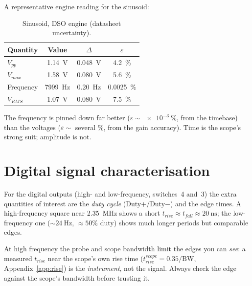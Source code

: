 \documentclass[11pt,a4paper,oneside]{book}
\begin{document}
A representative engine reading for the sinusoid:

\begin{table}[h]\centering\small
\caption{Sinusoid, DSO engine (datasheet uncertainty).}
\begin{tabular}{@{}lccc@{}}
\toprule
Quantity & Value & $\Delta$ & $\varepsilon$\\
\midrule
$V_{pp}$   & \qty{1.14}{\volt}   & \qty{0.048}{\volt}  & \qty{4.2}{\percent}\\
$V_{max}$  & \qty{1.58}{\volt}   & \qty{0.080}{\volt}  & \qty{5.6}{\percent}\\
Frequency  & \qty{7999}{\hertz}  & \qty{0.20}{\hertz}  & \qty{0.0025}{\percent}\\
$V_{RMS}$  & \qty{1.07}{\volt}   & \qty{0.080}{\volt}  & \qty{7.5}{\percent}\\
\bottomrule
\end{tabular}
\end{table}

\begin{note}
The frequency is pinned down far better ($\varepsilon\sim\qty{e-3}{\percent}$,
from the timebase) than the voltages ($\varepsilon\sim$ several \unit{\percent},
from the gain accuracy). Time is the scope's strong suit; amplitude is not.
\end{note}

\section{Digital signal characterisation}

For the digital outputs (high- and low-frequency, switches~4 and~3) the extra
quantities of interest are the \emph{duty cycle} (Duty$+$/Duty$-$) and the edge
times. A high-frequency square near \qty{2.35}{\mega\hertz} shows a short
$t_{rise}\approx t_{fall}\approx\qty{20}{\nano\second}$; the low-frequency one
($\sim\qty{24}{\hertz}$, $\approx 50\%$ duty) shows much longer periods but
comparable edges.

\begin{warning}
At high frequency the probe and scope bandwidth limit the edges you can
\emph{see}: a measured $t_{rise}$ near the scope's own rise time
($t_{rise}^{scope}=0.35/\mathrm{BW}$, Appendix~\ref{app:rise}) is the
\emph{instrument}, not the signal. Always check the edge against the scope's
bandwidth before trusting it.
\end{warning}

\appendix
\end{document}
